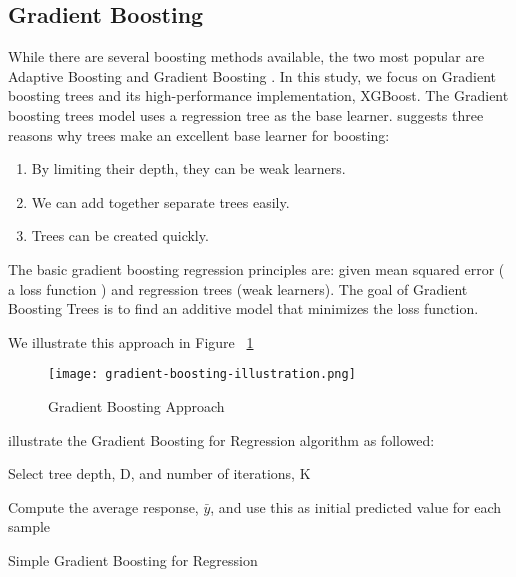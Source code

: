 \subsection{Gradient Boosting}

While there are several boosting methods available, the two most popular are
Adaptive Boosting \autocite{freund1997decision} and Gradient
Boosting \autocite{friedman2001greedy}. In this study, we focus on Gradient
boosting trees and its high-performance implementation, XGBoost.
The Gradient boosting trees model uses a regression tree as the base learner.
\citeauthor{kuhn2013applied} \parencite{kuhn2013applied} suggests three reasons
why trees make an excellent base learner for boosting:
\begin{enumerate}
    \item By limiting their depth, they can be weak learners.
    \item We can add together separate trees easily.
    \item Trees can be created quickly.
\end{enumerate}

The basic gradient boosting regression principles are: given mean squared error
( a loss function ) and regression trees (weak learners). The goal of Gradient
Boosting Trees is to find an additive model that minimizes the loss function.

We illustrate this approach in Figure ~\ref{fig:gradient-boosting-illustration}

\begin{figure}[H]\centering
    \caption{Gradient Boosting Approach}
    \label{fig:gradient-boosting-illustration}
    \texttt{[image: gradient-boosting-illustration.png]}
\end{figure}

\textcite{kuhn2013applied} illustrate the Gradient Boosting for
Regression algorithm as followed:

\begin{algorithm}[H]
\SetAlgoLined

\renewcommand{\labelenumi}{(\Roman{enumi})}
Select tree depth, D, and number of iterations, K

Compute the average response, $\bar{y}$, and use this as initial predicted value for each sample

 \caption{Simple Gradient Boosting for Regression}
\end{algorithm}
